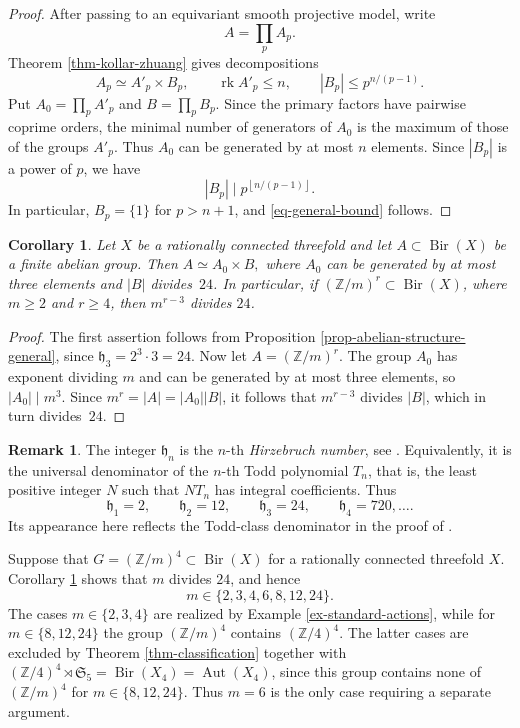 \documentclass[10pt,oneside,reqno]{amsart}
\numberwithin{equation}{section}
\newtheorem{corollary}[theorem]{Corollary}
\theoremstyle{definition}
\newtheorem{remark}[theorem]{Remark}
\newcommand{\Z}{\mathbb Z}
\newcommand{\rk}{\operatorname{rk}}
\begin{document}
\begin{proof}
After passing to an equivariant smooth projective model, write
\[
 A=\prod_p A_p.
\]
Theorem \ref{thm-kollar-zhuang} gives decompositions
\[
 A_p\simeq A'_p\times B_p,
 \qquad
 \rk A'_p\leq n,
 \qquad
 |B_p|\leq p^{n/(p-1)}.
\]
Put $A_0=\prod_p A'_p$ and $B=\prod_p B_p$.  Since the primary
factors have pairwise coprime orders, the minimal number of generators
of $A_0$ is the maximum of those of the groups $A'_p$.  Thus $A_0$ can
be generated by at most $n$ elements.  Since $|B_p|$ is a power of
$p$, we have
\[
 |B_p|\mid p^{\left\lfloor n/(p-1)\right\rfloor}.
\]
In particular, $B_p=\{1\}$ for $p>n+1$, and
\eqref{eq-general-bound} follows.
\end{proof}

\begin{corollary}
\label{cor-kollar-zhuang-uniform}
Let $X$ be a rationally connected threefold and let
$A\subset\operatorname{Bir}(X)$ be a finite abelian group.  Then
$
 A\simeq A_0\times B,
$
where $A_0$ can be generated by at most three elements and
$|B|$ divides~$24$.  In particular, if
$(\Z/m)^r\subset\operatorname{Bir}(X)$, where $m\geq2$ and $r\geq4$,
then $m^{r-3}$ divides $24$.
\end{corollary}

\begin{proof}
The first assertion follows from Proposition
\ref{prop-abelian-structure-general}, since
$\mathfrak h_3=2^3\cdot3=24$.  Now let $A=(\Z/m)^r$.  The group $A_0$
has exponent dividing $m$ and can be generated by at most three
elements, so $|A_0|\mid m^3$.  Since
$m^r=|A|=|A_0||B|$, it follows that
$m^{r-3}$ divides $|B|$, which in turn divides~$24$.
\end{proof}

\begin{remark}
The integer $\mathfrak h_n$ is the $n$-th \emph{Hirzebruch number},
see \cite{BuchstaberVeselov}.
Equivalently, it is the universal denominator of the $n$-th Todd
polynomial $T_n$, that is, the least positive integer $N$ such that
$NT_n$ has integral coefficients.  Thus
\[
 \mathfrak h_1=2,\qquad
 \mathfrak h_2=12,\qquad
 \mathfrak h_3=24,\qquad
 \mathfrak h_4=720,\ldots.
\]
Its appearance here reflects the Todd-class denominator in the proof
of \cite[Proposition~8]{KZh24}.
\end{remark}

Suppose that $G=(\Z/m)^4\subset\operatorname{Bir}(X)$ for a
rationally connected threefold $X$.  Corollary
\ref{cor-kollar-zhuang-uniform} shows that $m$ divides $24$, and hence
\[
 m\in\{2,3,4,6,8,12,24\}.
\]
The cases $m\in\{2,3,4\}$ are realized by Example
\ref{ex-standard-actions}, while for $m\in\{8,12,24\}$ the group
$(\Z/m)^4$ contains $(\Z/4)^4$.  The latter cases are excluded by
Theorem \ref{thm-classification} together with
$(\Z/4)^4\rtimes\mathfrak S_5=\operatorname{Bir}(X_4)=\operatorname{Aut}(X_4)$, since this group
contains none of $(\Z/m)^4$ for $m\in\{8,12,24\}$.  Thus $m=6$ is
the only case requiring a separate argument.
\end{document}
